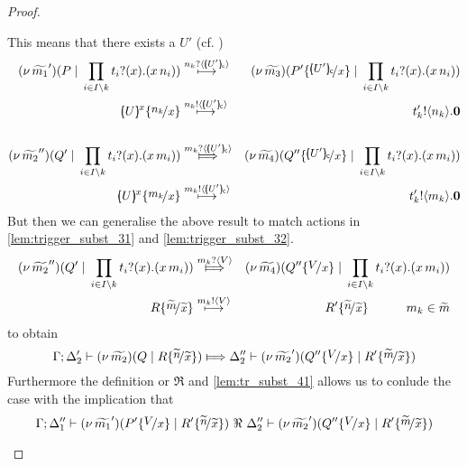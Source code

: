 \begin{proof}
\begin{enumerate}
\begin{enumerate}[i.]
							This means that there exists a $U'$ (cf. )
							\begin{eqnarray*}
								\newsp{\widetilde{m_1}'}{P \Par \prod_{i \in I\backslash{k}} \binp{t_i}{x} (\appl{x}{n_i})}
								&\hby{\bactinp{n_k}{\omapchar{U'}}}&
								\newsp{\widetilde{m_3}}{P' \subst{\omapchar{U'}}{x} \Par \prod_{i \in I\backslash{k}} \binp{t_i}{x} (\appl{x}{n_i})}
								\\
								\mapchar{U}{x} \subst{n_k}{x}
								&\hby{\bactout{n_k}{\omapchar{U'}}}&
								\bout{t'_k}{n_k} \inact
								\\
								\\
								\newsp{\widetilde{m_2}''}{Q' \Par \prod_{i \in I\backslash{k}} \binp{t_i}{x} (\appl{x}{m_i})}
								&\Hby{\bactinp{m_k}{\omapchar{U'}}}&
								\newsp{\widetilde{m_4}}{Q'' \subst{\omapchar{U'}}{x} \Par \prod_{i \in I\backslash{k}} \binp{t_i}{x} (\appl{x}{m_i})}
								\\
								\mapchar{U}{x} \subst{m_k}{x}
								&\hby{\bactout{m_k}{\omapchar{U'}}}&
								\bout{t'_k}{m_k} \inact
							\end{eqnarray*}
							But then we can generalise the above result to match actions in \eqref{lem:trigger_subst_31}
							and \eqref{lem:trigger_subst_32}. 
							\begin{eqnarray*}
								\newsp{\widetilde{m_2}''}{Q' \Par \prod_{i \in I\backslash{k}} \binp{t_i}{x} (\appl{x}{m_i})}
								&\Hby{\bactinp{m_k}{V}}&
								\newsp{\widetilde{m_4}}{Q'' \subst{V}{x} \Par \prod_{i \in I\backslash{k}} \binp{t_i}{x} (\appl{x}{m_i})}
								\\
								R \subst{\widetilde{m}}{\widetilde{x}}
								&\hby{\bactout{m_k}{V}}&
								R' \subst{\widetilde{n}}{\widetilde{x}} \qquad \quad m_k \in \widetilde{m}
							\end{eqnarray*}
							to obtain
							\[
								\horel{\Gamma}{\Delta_2'}{\newsp{\widetilde{m_2}}{Q \Par R \subst{\widetilde{n}}{\widetilde{x}} }}
								{\Hby{}}
								{\Delta_2''}{\newsp{\widetilde{m_2}'}{Q'' \subst{V}{x} \Par R' \subst{\widetilde{m}}{\widetilde{x}} }}
							\]
							Furthermore the definition or $\Re$ and \eqref{lem:tr_subst_41} allows us to
							conlude the case with the implication that
							\[
								\horel{\Gamma}{\Delta_1''}{\newsp{\widetilde{m_1}'}{P'\subst{V}{x} \Par R' \subst{\widetilde{n}}{\widetilde{x}} }}
								{\ \Re\ }
								{\Delta_2''}{\newsp{\widetilde{m_2}'}{Q'' \subst{V}{x} \Par R' \subst{\widetilde{m}}{\widetilde{x}} }}
							\]
			



\end{enumerate}
\end{enumerate}
\end{proof}
